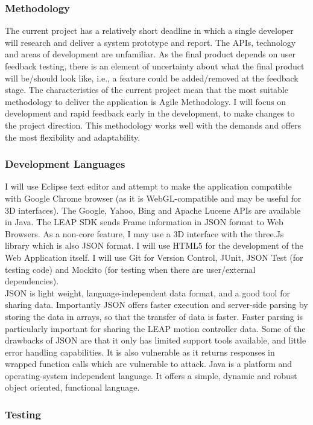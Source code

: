 \documentclass[10pt]{article}
\begin{document}
\subsubsection{Methodology}
The current project has a relatively short deadline in which a single developer will research and deliver a system prototype and report. The APIs, technology and areas of development are unfamiliar. As the final product depends on user feedback testing, there is an element of uncertainty about what the final product will be/should look like, i.e., a feature could be added/removed at the feedback stage. The characteristics of the current project mean that the most suitable methodology to deliver the application is Agile Methodology. I will focus on development and rapid feedback early in the development, to make changes to the project direction. This methodology works well with the demands and offers the most flexibility and adaptability.


\subsubsection{Development Languages}
I will use Eclipse text editor and attempt to make the application compatible with Google Chrome browser (as it is WebGL-compatible and may be useful for 3D interfaces). The Google, Yahoo, Bing and Apache Lucene APIs are available in Java. The LEAP SDK sends Frame information in JSON format to Web Browsers. As a non-core feature, I may use a 3D interface with the three.Js library which is also JSON format. I will use HTML5 for the development of the Web Application itself. I will use Git for Version Control, JUnit, JSON Test (for testing code) and Mockito (for testing when there are user/external dependencies). \\
JSON is light weight, language-independent data format, and a good tool for sharing data. Importantly JSON offers faster execution and server-side parsing by storing the data in arrays, so that the transfer of data is faster. Faster parsing is particularly important for sharing the LEAP motion controller data. Some of the drawbacks of JSON are that it only has limited support tools available, and little error handling capabilities. It is also vulnerable as it returns responses in wrapped function calls which are vulnerable to attack. Java is a platform and operating-system independent language. It offers a simple, dynamic and robust object oriented, functional language.

\subsubsection{Testing}
\end{document}
